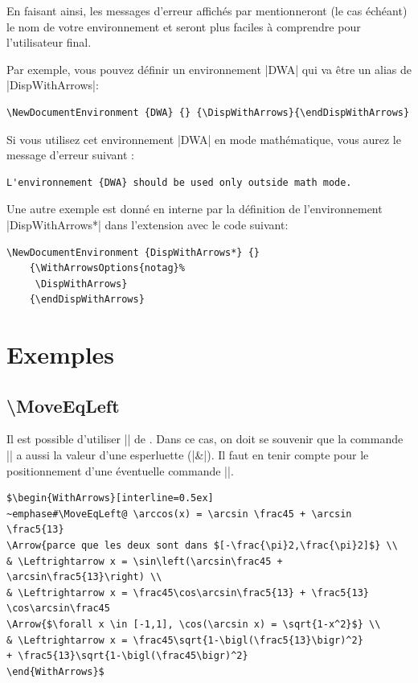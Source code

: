\documentclass[dvipsnames]{article}%
\def\interitem{\vspace{7mm plus 2 mm minus 3mm}}
\begin{document}
\begin{WithArrows}
\begin{WithArrows}[rr]
\smallskip
En faisant ainsi, les messages d'erreur affichés par  mentionneront (le cas échéant) le nom de
votre environnement et seront plus faciles à comprendre pour l'utilisateur final.

\smallskip
Par exemple, vous pouvez définir un environnement |{DWA}| qui va être un alias de |{DispWithArrows}|:
\begin{BVerbatim}
\NewDocumentEnvironment {DWA} {} {\DispWithArrows}{\endDispWithArrows}
\end{BVerbatim}

\smallskip
Si vous utilisez cet environnement |{DWA}| en mode mathématique, vous aurez le message d'erreur suivant :

\begin{BVerbatim}
L'environnement {DWA} should be used only outside math mode.
\end{BVerbatim}

\interitem
Une autre exemple est donné en interne par la définition de l'environnement |{DispWithArrows*}|
dans l'extension  avec le code suivant:
\begin{Verbatim}
\NewDocumentEnvironment {DispWithArrows*} {}
    {\WithArrowsOptions{notag}%
     \DispWithArrows}
    {\endDispWithArrows}
\end{Verbatim}



\section{Exemples}

\subsection{\textbackslash MoveEqLeft}

Il est possible d'utiliser |\MoveEqLeft| de . Dans ce cas, on doit se souvenir que la commande
|\MoveEqLeft| a aussi la valeur d'une esperluette (|&|). Il faut en tenir compte pour le positionnement
d'une éventuelle commande |\Arrow|.


%
\begin{Verbatim}[formatcom=\small\color{gray}]
$\begin{WithArrows}[interline=0.5ex]
~emphase#\MoveEqLeft@ \arccos(x) = \arcsin \frac45 + \arcsin \frac5{13} 
\Arrow{parce que les deux sont dans $[-\frac{\pi}2,\frac{\pi}2]$} \\
& \Leftrightarrow x = \sin\left(\arcsin\frac45 + \arcsin\frac5{13}\right) \\
& \Leftrightarrow x = \frac45\cos\arcsin\frac5{13} + \frac5{13} \cos\arcsin\frac45 
\Arrow{$\forall x \in [-1,1], \cos(\arcsin x) = \sqrt{1-x^2}$} \\
& \Leftrightarrow x = \frac45\sqrt{1-\bigl(\frac5{13}\bigr)^2}
+ \frac5{13}\sqrt{1-\bigl(\frac45\bigr)^2} 
\end{WithArrows}$
\end{Verbatim}



\end{WithArrows}
\end{WithArrows}
\end{document}

